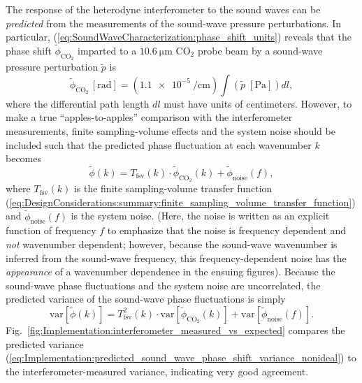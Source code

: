The response of the heterodyne interferometer to the sound waves
can be \emph{predicted} from the measurements
of the sound-wave pressure perturbations.
In particular,
(\ref{eq:SoundWaveCharacterization:phase_shift_units})
reveals that the phase shift $\tilde{\phi}_{\text{CO}_2}$
imparted to a $\SI{10.6}{\micro\meter}$ CO$_2$ probe beam
by a sound-wave pressure perturbation $\tilde{p}$ is
\begin{equation}
  \tilde{\phi}_{\text{CO}_2} \, [\text{rad}]
  =
  (\SI{1.1e-5}{\per\centi\meter})
  \int
  (\tilde{p} \; [\text{Pa}])
  dl,
  \label{eq:Implementation:predicted_sound_wave_phase_shift_ideal}
\end{equation}
where the differential path length $dl$ must have units of centimeters.
However, to make a true ``apples-to-apples'' comparison
with the interferometer measurements,
finite sampling-volume effects and the system noise should be included
such that the predicted phase fluctuation at each wavenumber $k$ becomes
\begin{equation}
  \tilde{\phi}(k)
  =
  T_{\text{fsv}}(k)
  \cdot
  \tilde{\phi}_{\text{CO}_2}(k)
  +
  \tilde{\phi}_{\text{noise}}(f),
  \label{eq:Implementation:predicted_sound_wave_phase_shift_nonideal}
\end{equation}
where
$T_{\text{fsv}}(k)$ is the finite sampling-volume transfer function
(\ref{eq:DesignConsiderations:summary:finite_sampling_volume_transfer_function})
and $\tilde{\phi}_{\text{noise}}(f)$ is the system noise.
(Here, the noise is written as an explicit function of frequency $f$
to emphasize that the noise is frequency dependent and
\emph{not} wavenumber dependent;
however, because the sound-wave wavenumber is inferred
from the sound-wave frequency,
this frequency-dependent noise
has the \emph{appearance} of a wavenumber dependence
in the ensuing figures).
Because the sound-wave phase fluctuations and
the system noise are uncorrelated,
the predicted variance of the sound-wave phase fluctuations is simply
\begin{equation}
  \text{var}\left[
    \tilde{\phi}(k)
  \right]
  =
  T^2_{\text{fsv}}(k)
  \cdot
  \text{var}\left[
    \tilde{\phi}_{\text{CO}_2}(k)
  \right]
  +
  \text{var}\left[
    \tilde{\phi}_{\text{noise}}(f)
  \right].
  \label{eq:Implementation:predicted_sound_wave_phase_shift_variance_nonideal}
\end{equation}
Fig.~\ref{fig:Implementation:interferometer_measured_vs_expected}
compares the predicted variance
(\ref{eq:Implementation:predicted_sound_wave_phase_shift_variance_nonideal})
to the interferometer-measured variance,
indicating very good agreement.

